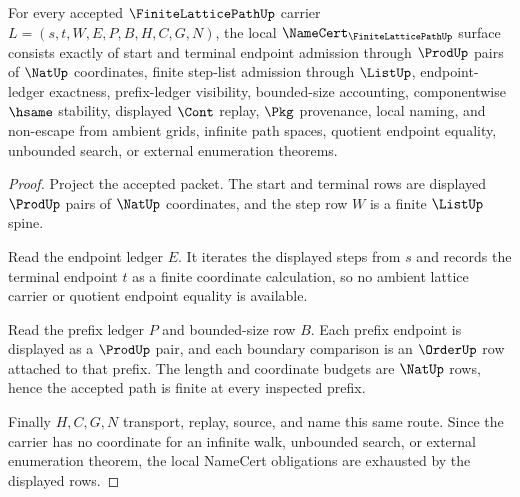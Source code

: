 \begin{theorem}
\label{thm:finite-lattice-path-namecert-obligations}
For every accepted $\FiniteLatticePathUp$ carrier $L=(s,t,W,E,P,B,H,C,G,N)$, the local $\NameCert_{\FiniteLatticePathUp}$ surface consists exactly of start and terminal endpoint admission through $\ProdUp$ pairs of $\NatUp$ coordinates, finite step-list admission through $\ListUp$, endpoint-ledger exactness, prefix-ledger visibility, bounded-size accounting, componentwise $\hsame$ stability, displayed $\Cont$ replay, $\Pkg$ provenance, local naming, and non-escape from ambient grids, infinite path spaces, quotient endpoint equality, unbounded search, or external enumeration theorems.
\end{theorem}
\begin{proof}
Project the accepted packet. The start and terminal rows are displayed $\ProdUp$ pairs of $\NatUp$ coordinates, and the step row $W$ is a finite $\ListUp$ spine.

Read the endpoint ledger $E$. It iterates the displayed steps from $s$ and records the terminal endpoint $t$ as a finite coordinate calculation, so no ambient lattice carrier or quotient endpoint equality is available.

Read the prefix ledger $P$ and bounded-size row $B$. Each prefix endpoint is displayed as a $\ProdUp$ pair, and each boundary comparison is an $\OrderUp$ row attached to that prefix. The length and coordinate budgets are $\NatUp$ rows, hence the accepted path is finite at every inspected prefix.

Finally $H,C,G,N$ transport, replay, source, and name this same route. Since the carrier has no coordinate for an infinite walk, unbounded search, or external enumeration theorem, the local NameCert obligations are exhausted by the displayed rows.
\end{proof}

